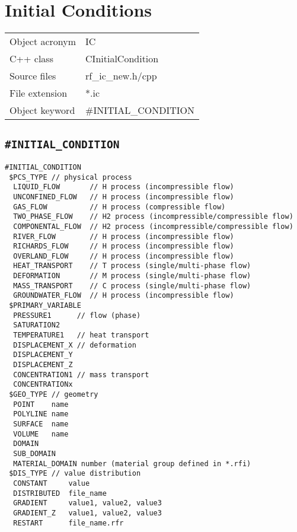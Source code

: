 \section{Initial Conditions}

\begin{tabular*}{8.35cm}{|p{2.5cm}|p{5cm}|} \hline
Object acronym & IC \\
C++ class      & CInitialCondition \\
Source files   & rf\_ic\_new.h/cpp \\
\hline
File extension & *.ic \\
Object keyword & \#INITIAL\_CONDITION \\
\hline
\end{tabular*}


\subsection{\texttt{\bf\#INITIAL\_CONDITION}}


\begin{verbatim}
#INITIAL_CONDITION
 $PCS_TYPE // physical process
  LIQUID_FLOW       // H process (incompressible flow)
  UNCONFINED_FLOW   // H process (incompressible flow)
  GAS_FLOW          // H process (compressible flow)
  TWO_PHASE_FLOW    // H2 process (incompressible/compressible flow)
  COMPONENTAL_FLOW  // H2 process (incompressible/compressible flow)
  RIVER_FLOW        // H process (incompressible flow)
  RICHARDS_FLOW     // H process (incompressible flow)
  OVERLAND_FLOW     // H process (incompressible flow)
  HEAT_TRANSPORT    // T process (single/multi-phase flow)
  DEFORMATION       // M process (single/multi-phase flow)
  MASS_TRANSPORT    // C process (single/multi-phase flow)
  GROUNDWATER_FLOW  // H process (incompressible flow)
 $PRIMARY_VARIABLE
  PRESSURE1      // flow (phase)
  SATURATION2
  TEMPERATURE1   // heat transport
  DISPLACEMENT_X // deformation
  DISPLACEMENT_Y
  DISPLACEMENT_Z
  CONCENTRATION1 // mass transport
  CONCENTRATIONx
 $GEO_TYPE // geometry
  POINT    name
  POLYLINE name
  SURFACE  name
  VOLUME   name
  DOMAIN
  SUB_DOMAIN
  MATERIAL_DOMAIN number (material group defined in *.rfi)
 $DIS_TYPE // value distribution
  CONSTANT     value
  DISTRIBUTED  file_name
  GRADIENT     value1, value2, value3
  GRADIENT_Z   value1, value2, value3
  RESTART      file_name.rfr
\end{verbatim}


